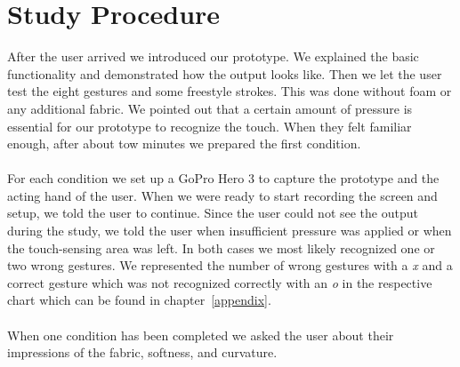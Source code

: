 \section{Study Procedure}
After the user arrived we introduced our prototype. We explained the basic functionality and demonstrated how the output looks like. Then we let the user test the eight gestures and some freestyle strokes. This was done without foam or any additional fabric. We pointed out that a certain amount of pressure is essential for our prototype to recognize the touch. When they felt familiar enough, after about tow minutes we prepared the first condition. 
\\ \\
For each condition we set up a GoPro Hero 3 to capture the prototype and the acting hand of the user. When we were ready to start recording the screen and setup, we told the user to continue. Since the user could not see the output during the study, we told the user when insufficient  pressure was applied or when the touch-sensing area was left. In both cases we most likely recognized one or two wrong gestures. We represented the number of wrong gestures with a \emph{x} and a correct gesture which was not recognized correctly with an \emph{o} in the respective chart which can be found in chapter~\ref{appendix}. 
\\ \\
When one condition has been completed we asked the user about their impressions of the fabric, softness, and curvature. 


